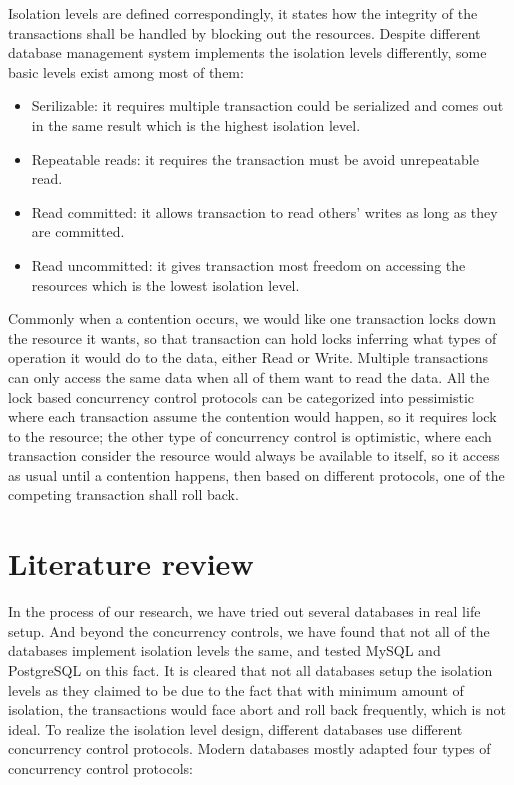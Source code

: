 Isolation levels are defined correspondingly, it states how the integrity of the transactions shall be handled by blocking out the resources. Despite different database management system implements the isolation levels differently, some basic levels exist among most of them:
\begin{itemize}
	\item Serilizable: it requires multiple transaction could be serialized and comes out in the same result which is the highest isolation level.
	
	\item Repeatable reads: it requires the transaction must be avoid unrepeatable read.
	
	\item Read committed: it allows transaction to read others' writes as long as they are committed.
	
	\item Read uncommitted: it gives transaction most freedom on accessing the resources which is the lowest isolation level.
\end{itemize}


Commonly when a contention occurs, we would like one transaction locks down the resource it wants, so that transaction can hold locks inferring what types of operation it would do to the data, either Read or Write. Multiple transactions can only access the same data when all of them want to read the data. All the lock based concurrency control protocols can be categorized into pessimistic where each transaction assume the contention would happen, so it requires lock to the resource; the other type of concurrency control is optimistic, where each transaction consider the resource would always be available to itself, so it access as usual until a contention happens, then based on different protocols, one of the competing transaction shall roll back.
\section{Literature review}

In the process of our research, we have tried out several databases in real life setup. And beyond the concurrency controls, we have found that not all of the databases implement isolation levels the same\cite{adya2000generalized}, and tested MySQL and PostgreSQL on this fact. It is cleared that not all databases setup the isolation levels as they claimed to be due to the fact that with minimum amount of isolation, the transactions would face abort and roll back frequently, which is not ideal. To realize the isolation level design, different databases use different concurrency control protocols. Modern databases mostly adapted four types of concurrency control protocols:

